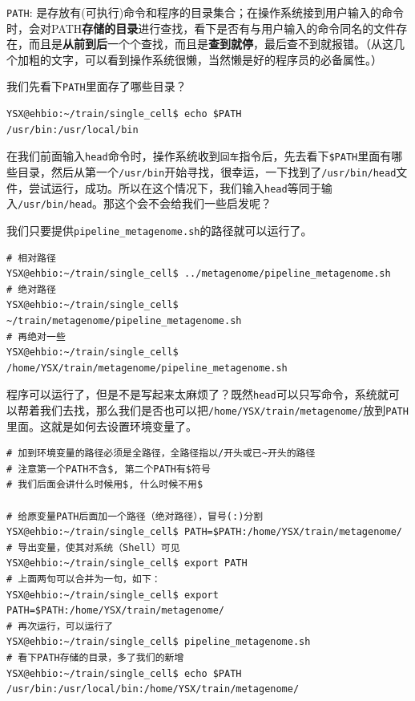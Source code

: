 \documentclass[]{article}
\numberwithin{figure}{section}
\numberwithin{table}{section}
\begin{document}
\texttt{PATH}: 是存放有(可执行)命令和程序的目录集合；在操作系统接到用户输入的命令时，会对PATH\textbf{存储的目录}进行查找，看下是否有与用户输入的命令同名的文件存在，而且是\textbf{从前到后}一个个查找，而且是\textbf{查到就停}，最后查不到就报错。（从这几个加粗的文字，可以看到操作系统很懒，当然懒是好的程序员的必备属性。）

我们先看下\texttt{PATH}里面存了哪些目录？

\begin{verbatim}
YSX@ehbio:~/train/single_cell$ echo $PATH
/usr/bin:/usr/local/bin
\end{verbatim}

在我们前面输入\texttt{head}命令时，操作系统收到\texttt{回车}指令后，先去看下\texttt{\$PATH}里面有哪些目录，然后从第一个\texttt{/usr/bin}开始寻找，很幸运，一下找到了\texttt{/usr/bin/head}文件，尝试运行，成功。所以在这个情况下，我们输入\texttt{head}等同于输入\texttt{/usr/bin/head}。那这个会不会给我们一些启发呢？

我们只要提供\texttt{pipeline\_metagenome.sh}的路径就可以运行了。

\begin{verbatim}
# 相对路径
YSX@ehbio:~/train/single_cell$ ../metagenome/pipeline_metagenome.sh
# 绝对路径
YSX@ehbio:~/train/single_cell$ ~/train/metagenome/pipeline_metagenome.sh
# 再绝对一些
YSX@ehbio:~/train/single_cell$ /home/YSX/train/metagenome/pipeline_metagenome.sh
\end{verbatim}

程序可以运行了，但是不是写起来太麻烦了？既然\texttt{head}可以只写命令，系统就可以帮着我们去找，那么我们是否也可以把\texttt{/home/YSX/train/metagenome/}放到\texttt{PATH}里面。这就是如何去设置环境变量了。

\begin{verbatim}
# 加到环境变量的路径必须是全路径，全路径指以/开头或已~开头的路径
# 注意第一个PATH不含$, 第二个PATH有$符号
# 我们后面会讲什么时候用$, 什么时候不用$

# 给原变量PATH后面加一个路径（绝对路径），冒号(:)分割
YSX@ehbio:~/train/single_cell$ PATH=$PATH:/home/YSX/train/metagenome/
# 导出变量，使其对系统（Shell）可见
YSX@ehbio:~/train/single_cell$ export PATH
# 上面两句可以合并为一句，如下：
YSX@ehbio:~/train/single_cell$ export PATH=$PATH:/home/YSX/train/metagenome/
# 再次运行，可以运行了
YSX@ehbio:~/train/single_cell$ pipeline_metagenome.sh
# 看下PATH存储的目录，多了我们的新增
YSX@ehbio:~/train/single_cell$ echo $PATH
/usr/bin:/usr/local/bin:/home/YSX/train/metagenome/
\end{verbatim}
\end{document}
